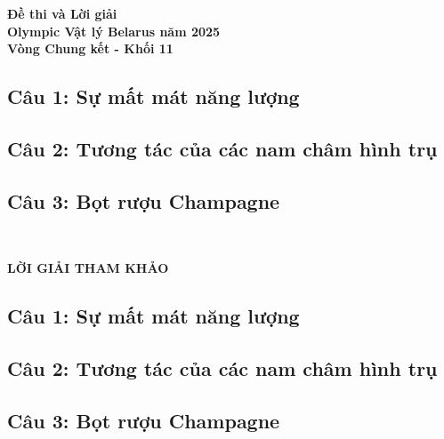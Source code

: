 \documentclass[12pt]{article}
\begin{document}
\thispagestyle{plain}

\begin{center}
  \LARGE{\textbf{Đề thi và Lời giải\\
      Olympic Vật lý Belarus năm 2025\\
      Vòng Chung kết - Khối 11}}
\end{center}


\subsection*{Câu 1: Sự mất mát năng lượng}


\newpage
\subsection*{Câu 2: Tương tác của các nam châm hình trụ}


\subsection*{Câu 3: Bọt rượu Champagne}


\newpage
\quad\\
\begin{center}
  \vspace{-1cm}
  \noindent\LARGE\textbf{LỜI GIẢI THAM KHẢO}
\end{center}

\subsection*{Câu 1: Sự mất mát năng lượng}


\subsection*{Câu 2: Tương tác của các nam châm hình trụ}


\subsection*{Câu 3: Bọt rượu Champagne}

\end{document}
